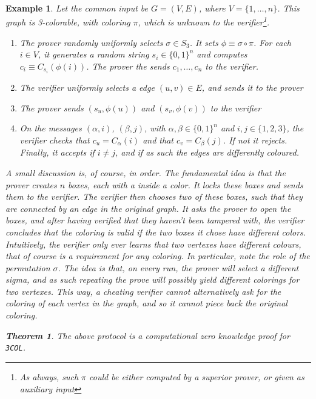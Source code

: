 \documentclass{article}
\newtheorem{theorem}{Theorem}
\newtheorem{example}{Example}
\begin{document}
\begin{example}
    Let the common input be $G = (V, E)$, where $V = \{1, \dots, n \}$.
    This graph is 3-colorable, with coloring $\pi$, which is unknown to the verifier\footnote{As always, such $\pi$ could be either computed by a superior prover, or given as auxiliary input}. 
    \begin{enumerate}
        \item The prover randomly uniformly selects $\sigma \in S_3$. It sets $\phi \equiv \sigma \circ \pi$.
                For each $i \in V$, it generates a random string $s_i \in \{0, 1\}^n$ and computes $c_i \equiv C_{s_i}(\phi(i))$.
                The prover the sends $c_1, \dots, c_n$ to the verifier.
        \item The verifier uniformly selects a edge $(u, v) \in E$, and sends it to the prover
        \item The prover sends $(s_u, \phi(u))$ and $(s_v, \phi(v))$ to the verifier
        \item On the messages $(\alpha, i)$, $(\beta, j)$, with $\alpha, \beta \in \{0, 1\}^n$ and $i, j \in  \{1, 2, 3\}$, the verifier checks that $c_u = C_\alpha(i)$ and that 
                $c_v = C_\beta(j)$. If not it rejects. Finally, it accepts if $i \neq j$, and if as such the edges are differently coloured.
    \end{enumerate}
    A small discussion is, of course, in order. The fundamental idea is that the prover creates $n$ boxes, each with a inside a color.
    It locks these boxes and sends them to the verifier. The verifier then chooses two of these boxes, such that they are connected by an edge in the original graph.
    It asks the prover to open the boxes, and after having verified that they haven't been tampered with, the verifier concludes that the coloring is valid if the two boxes it chose have different colors.
    Intuitively, the verifier only ever learns that two vertexes have different colours, that of course is a requirement for any coloring.
    In particular, note the role of the permutation $\sigma$. The idea is that, on every run, the prover will select a different sigma, and as such
    repeating the prove will possibly yield different colorings for two vertexes. This way, a cheating verifier cannot alternatively ask for the coloring 
    of each vertex in the graph, and so it cannot piece back the original coloring.
    \begin{theorem}
        The above protocol is a computational zero knowledge proof for \texttt{3COL}.
    \end{theorem}

\end{example}
\end{document}
